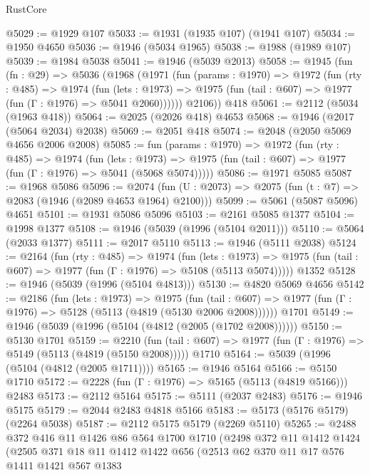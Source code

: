 \begin{lexlean}{RustCore}
\begin{coremodule}
@5029 := @1929 @107
@5033 := @1931 (@1935 @107) (@1941 @107)
@5034 := @1950 @4650
@5036 := @1946 (@5034 @1965)
@5038 := @1988 (@1989 @107)
@5039 := @1984 @5038
@5041 := @1946 (@5039 @2013)
@5058 := @1945
    (fun (fn : @29) =>
    @5036
      (@1968
        (@1971
          (fun (params : @1970) =>
          @1972
            (fun (rty : @485) =>
            @1974
              (fun (lets : @1973) =>
              @1975 (fun (tail : @607) => @1977 (fun (Γ : @1976) => @5041 @2060))))))
        @2106))
    @418
@5061 := @2112 (@5034 (@1963 @418))
@5064 := @2025 (@2026 @418) @4653
@5068 := @1946 (@2017 (@5064 @2034) @2038)
@5069 := @2051 @418
@5074 := @2048 (@2050 @5069 @4656 @2006 @2008)
@5085 := fun (params : @1970) =>
  @1972
    (fun (rty : @485) =>
    @1974
      (fun (lets : @1973) =>
      @1975 (fun (tail : @607) => @1977 (fun (Γ : @1976) => @5041 (@5068 @5074)))))
@5086 := @1971 @5085
@5087 := @1968 @5086
@5096 := @2074 (fun (U : @2073) => @2075 (fun (t : @7) => @2083 (@1946 (@2089 @4653 @1964) @2100)))
@5099 := @5061 (@5087 @5096) @4651
@5101 := @1931 @5086 @5096
@5103 := @2161 @5085 @1377
@5104 := @1998 @1377
@5108 := @1946 (@5039 (@1996 (@5104 @2011)))
@5110 := @5064 (@2033 @1377)
@5111 := @2017 @5110
@5113 := @1946 (@5111 @2038)
@5124 := @2164
    (fun (rty : @485) =>
    @1974
      (fun (lets : @1973) =>
      @1975 (fun (tail : @607) => @1977 (fun (Γ : @1976) => @5108 (@5113 @5074)))))
    @1352
@5128 := @1946 (@5039 (@1996 (@5104 @4813)))
@5130 := @4820 @5069 @4656
@5142 := @2186
    (fun (lets : @1973) =>
    @1975
      (fun (tail : @607) => @1977 (fun (Γ : @1976) => @5128 (@5113 (@4819 (@5130 @2006 @2008))))))
    @1701
@5149 := @1946 (@5039 (@1996 (@5104 (@4812 (@2005 (@1702 @2008))))))
@5150 := @5130 @1701
@5159 := @2210
    (fun (tail : @607) => @1977 (fun (Γ : @1976) => @5149 (@5113 (@4819 (@5150 @2008)))))
    @1710
@5164 := @5039 (@1996 (@5104 (@4812 (@2005 @1711))))
@5165 := @1946 @5164
@5166 := @5150 @1710
@5172 := @2228 (fun (Γ : @1976) => @5165 (@5113 (@4819 @5166))) @2483
@5173 := @2112 @5164
@5175 := @5111 (@2037 @2483)
@5176 := @1946 @5175
@5179 := @2044 @2483 @4818 @5166
@5183 := @5173 (@5176 @5179) (@2264 @5038)
@5187 := @2112 @5175 @5179 (@2269 @5110)
@5265 := @2488
    @372
    @416
    @11
    @1426
    @86
    @564
    @1700
    @1710
    (@2498
      @372
      @11
      @1412
      @1424
      (@2505
        @371
        @18
        @11
        @1412
        @1422
        @656
        (@2513
          @62
          @370
          @11
          @17
          @576
          @1411
          @1421
          @567
          @1383

\end{coremodule}
\end{lexlean}
